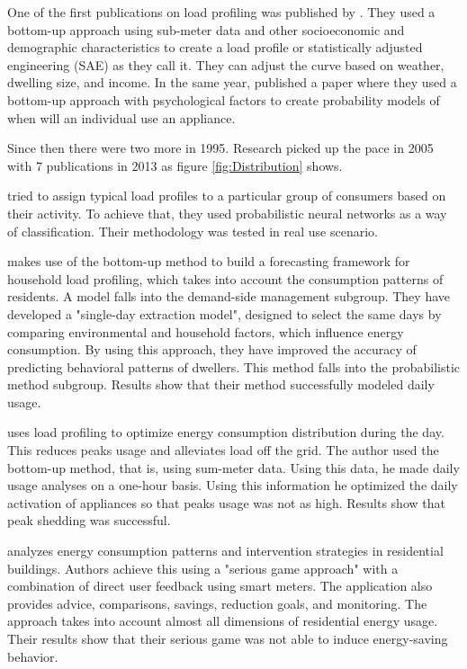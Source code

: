 \documentclass[
11pt, %
english, %
singlespacing, %
headsepline, %
]{MastersDoctoralThesis} %
\begin{document}
One of the first publications on load profiling was published by \cite{TRAIN19851103}.
They used a bottom-up approach using sub-meter data and other socioeconomic and demographic characteristics 
to create a load profile or statistically adjusted engineering (SAE) as they call it.
They can adjust the curve based on weather, dwelling size, and income. 
In the same year, \cite{WALKER1985} published a paper where they used a bottom-up approach with psychological factors to create probability models of when will an individual use an appliance.

Since then there were two more in 1995. Research picked up the pace in 2005 with 7 publications in 2013 as figure \ref{fig:Distribution} shows.

\cite{GERBEC2005} tried to assign typical load profiles to a particular group of consumers based on their activity. 
To achieve that, they used probabilistic neural networks as a way of classification. Their methodology was tested in real use scenario. 

\cite{Gao2018} makes use of the bottom-up method to build a forecasting framework for household
load profiling, which takes into account the consumption patterns of residents. 
A model falls into the demand-side management subgroup.
They have developed a "single-day extraction model", designed to select the same days by comparing environmental and household factors, which influence energy consumption.
By using this approach, they have improved the accuracy of predicting behavioral patterns of dwellers. 
This method falls into the probabilistic method subgroup. Results show that their method successfully modeled daily usage.

\cite{Chuan2014} uses load profiling to optimize energy consumption distribution during the day.
This reduces peaks usage and alleviates load off the grid. The author used the bottom-up method, that is, using sum-meter data.
Using this data, he made daily usage analyses on a one-hour basis. Using this information he optimized the daily activation of appliances
so that peaks usage was not as high. Results show that peak shedding was successful. 

\cite{Csoknyai2019} analyzes energy consumption patterns and intervention strategies in residential buildings.
Authors achieve this using a "serious game approach" with a combination of direct user feedback using smart meters. 
The application also provides advice, comparisons, savings, reduction goals, and monitoring.
The approach takes into account almost all dimensions of residential energy usage. Their results show that their serious game was not
able to induce energy-saving behavior.
\end{document}

